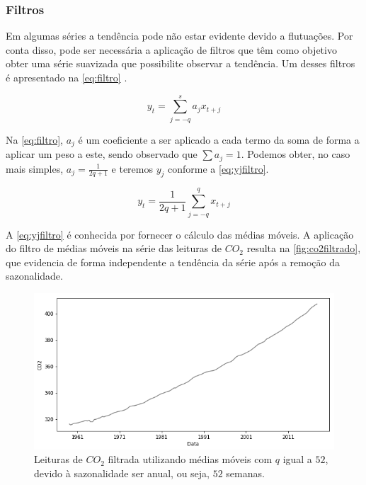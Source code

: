 \documentclass[
    12pt,
    oneside,
    a4paper,
    english,
    brazil
]{abntex2}
\begin{document}
\subsubsection{Filtros}

Em algumas séries a tendência pode  não estar evidente devido a flutuações. Por
conta disso, pode  ser necessária a aplicação de filtros  que têm como objetivo
obter  uma série  suavizada que  possibilite  observar a  tendência. Um  desses
filtros é apresentado na \autoref{eq:filtro} \cite{ehlers}.

\begin{equation}
    \label{eq:filtro}
    y_t = \sum_{j = -q}^{s}{a_{j}x_{t+j}}
\end{equation}

Na \autoref{eq:filtro}, $a_j$  é um coeficiente a ser aplicado  a cada termo da
soma de forma a aplicar um peso a este, sendo observado que $\sum{a_j} = 1$.
Podemos obter, no caso  mais simples, $a_j = \frac{1}{2q +  1}$ e teremos $y_j$
conforme a \autoref{eq:yjfiltro}.

\begin{equation}
    \label{eq:yjfiltro}
    y_t = \frac{1}{2q + 1}\sum_{j=-q}^{q}{x_{t+j}}
\end{equation}

A \autoref{eq:yjfiltro} é conhecida por fornecer o cálculo das médias móveis.
A aplicação do filtro de médias móveis  na série das leituras de $CO_2$ resulta
na \autoref{fig:co2filtrado},  que evidencia de forma  independente a tendência
da série após a remoção da sazonalidade.

\begin{figure}
    \centering
    \caption{Leituras de $CO_2$ filtrada utilizando médias móveis com $q$ igual
        a $52$, devido à sazonalidade ser anual, ou seja, $52$
        semanas.}\label{fig:co2filtrado}
    \includegraphics[width=.6\linewidth]{images/co2_filtered.png}
\end{figure}
\end{document}
